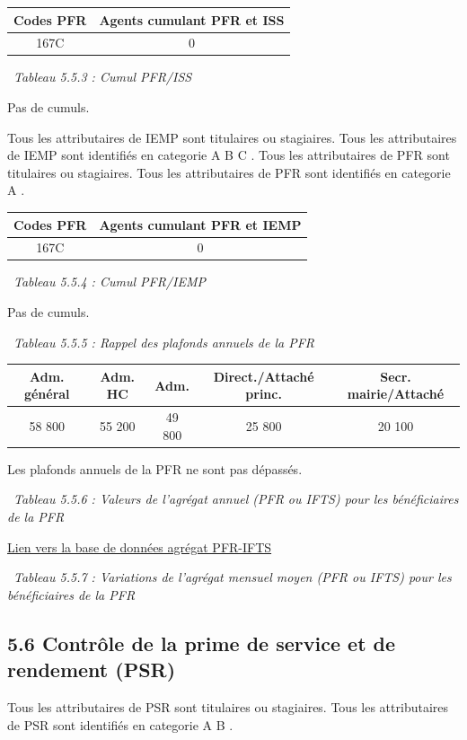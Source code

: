 \begin{longtable}[]{@{}cc@{}}
\toprule
Codes PFR & Agents cumulant PFR et ISS\tabularnewline
\midrule
\endhead
167C & 0\tabularnewline
\bottomrule
\end{longtable}

~\emph{Tableau 5.5.3 : Cumul PFR/ISS}

Pas de cumuls.

Tous les attributaires de IEMP sont titulaires ou stagiaires. Tous les
attributaires de IEMP sont identifiés en categorie A B C . Tous les
attributaires de PFR sont titulaires ou stagiaires. Tous les
attributaires de PFR sont identifiés en categorie A .

\begin{longtable}[]{@{}cc@{}}
\toprule
Codes PFR & Agents cumulant PFR et IEMP\tabularnewline
\midrule
\endhead
167C & 0\tabularnewline
\bottomrule
\end{longtable}

~\emph{Tableau 5.5.4 : Cumul PFR/IEMP}

Pas de cumuls.

~\emph{Tableau 5.5.5 : Rappel des plafonds annuels de la PFR}

\begin{longtable}[]{@{}ccccc@{}}
\toprule
Adm. général & Adm. HC & Adm. & Direct./Attaché princ. & Secr.
mairie/Attaché\tabularnewline
\midrule
\endhead
58 800 & 55 200 & 49 800 & 25 800 & 20 100\tabularnewline
\bottomrule
\end{longtable}

Les plafonds annuels de la PFR ne sont pas dépassés.

~\emph{Tableau 5.5.6 : Valeurs de l'agrégat annuel (PFR ou IFTS) pour
les bénéficiaires de la PFR}

\href{../Bases/Remunerations/beneficiaires.PFR.IFTS.csv}{Lien vers la base
de données agrégat PFR-IFTS}

~\emph{Tableau 5.5.7 : Variations de l'agrégat mensuel moyen (PFR ou
IFTS) pour les bénéficiaires de la PFR}

\hypertarget{controle-de-la-prime-de-service-et-de-rendement-psr}{%
\subsection{5.6 Contrôle de la prime de service et de rendement
(PSR)}\label{controle-de-la-prime-de-service-et-de-rendement-psr}}

Tous les attributaires de PSR sont titulaires ou stagiaires. Tous les
attributaires de PSR sont identifiés en categorie A B .


